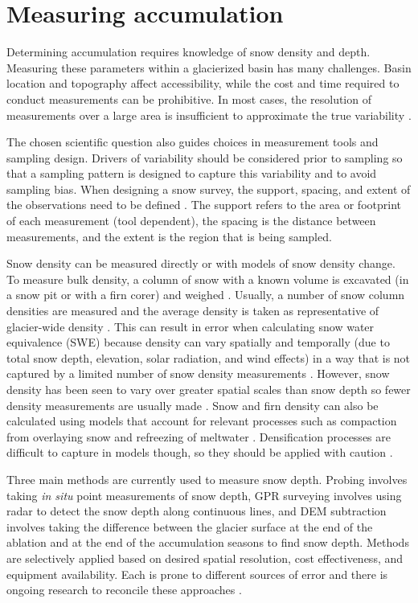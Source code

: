 \documentclass{sfuthesis}
\begin{document}
\section{Measuring accumulation}
Determining accumulation requires knowledge of snow density and depth. Measuring these parameters within a glacierized basin has many challenges. Basin location and topography affect accessibility, while the cost and time required to conduct measurements can be prohibitive. In most cases, the resolution of measurements over a large area is insufficient to approximate the true variability \citep{Bloeschl1999, Deems2006a}.

The chosen scientific question also guides choices in measurement tools and sampling design. Drivers of variability should be considered prior to sampling so that a sampling pattern is designed to capture this variability and to avoid sampling bias. When designing a snow survey, the support, spacing, and extent of the observations need to be defined \citep{Bloschl1995}. The support refers to the area or footprint of each measurement (tool dependent), the spacing is the distance between measurements, and the extent is the region that is being sampled. 

Snow density can be measured directly or with models of snow density change. To measure bulk density, a column of snow with a known volume is excavated (in a snow pit or with a firn corer) and weighed \citep{Sold2013, Sold2014}. Usually, a number of snow column densities are measured and the average density is taken as representative of glacier-wide density \citep[e.g.][]{Machguth2006, Grunewald2010, McGrath2015}. This can result in error when calculating snow water equivalence (SWE) because density can vary spatially and temporally (due to total snow depth, elevation, solar radiation, and wind effects) in a way that is not captured by a limited number of snow density measurements \citep{Grunewald2010, Wetlaufer2016}. However, snow density has been seen to vary over greater spatial scales than snow depth so fewer density measurements are usually made \citep{Elder1998, Clark2011}. Snow and firn density can also be calculated using models that account for relevant processes such as compaction from overlaying snow and refreezing of meltwater \citep{Herron1980, Sold2014}. Densification processes are difficult to capture in models though, so they should be applied with caution \citep{Mellor1974}.

Three main methods are currently used to measure snow depth. Probing involves taking \textit{in situ} point measurements of snow depth, GPR surveying involves using radar to detect the snow depth along continuous lines, and DEM subtraction involves taking the difference between the glacier surface at the end of the ablation and at the end of the accumulation seasons to find snow depth. Methods are selectively applied based on desired spatial resolution, cost effectiveness, and equipment availability. Each is prone to different sources of error and there is ongoing research to reconcile these approaches \citep{Sold2014}.  
\end{document}
